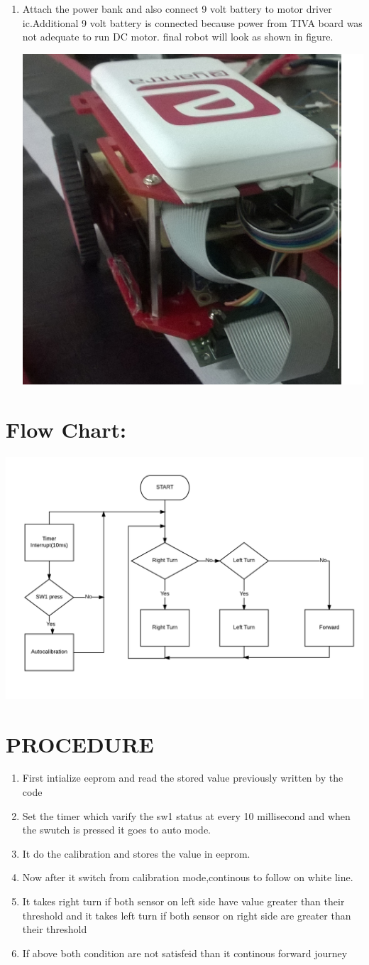 \documentclass[a4paper,12pt,oneside]{book}
\begin{document}
\begin{enumerate}
\item Attach the power bank and also connect 9 volt battery to motor driver ic.Additional 9 volt battery is connected because power from TIVA board was not adequate to run DC motor. final robot will look as shown in figure.

\includegraphics[width=300 px]{img4.png}

\end{enumerate}
\section{Flow Chart:}


\includegraphics[width=400 px]{flowchart.png}


\section{PROCEDURE}
\begin{enumerate}
\item First intialize eeprom and read the stored value previously written by the code
\item Set the timer which varify the sw1 status at every 10 millisecond and when the swutch is pressed it goes to auto mode.
\item It do the calibration and stores the value in eeprom.
\item Now after it switch from calibration mode,continous to follow on white line.
\item It takes right turn if both sensor on left side have value greater than their threshold and it takes left turn if both sensor on right side are greater than their threshold
\item If above both condition are not satisfeid than it continous forward journey
\end{enumerate}
\end{document}
